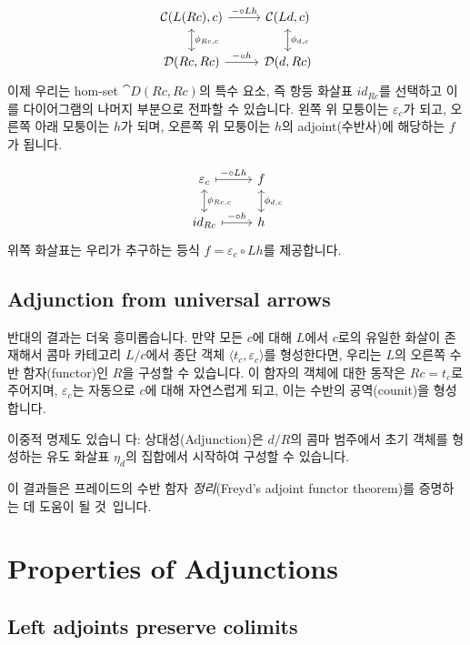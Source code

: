 \documentclass[DaoFP]{subfiles}
\begin{document}
\[
 \begin{tikzcd}
 \mathcal{C}(L (R c), c)
 \arrow[d, leftrightarrow, "\phi_{R c, c}"]
 \arrow[r, "- \circ L h"]
 &
 \mathcal{C}(L d, c)
  \arrow[d, leftrightarrow, "\phi_{d, c}"]
 \\
 \mathcal{D}(R c, R c)
 \arrow[r, "- \circ h"]
& \mathcal{D}(d, R c)
 \end{tikzcd}
\]
이제 우리는 hom-set $\cat D(R c, R c)$의 특수 요소, 즉 항등 화살표 $id_{R c}$를 선택하고 이를 다이어그램의 나머지 부분으로 전파할 수 있습니다. 왼쪽 위 모퉁이는 $\varepsilon_c$가 되고, 오른쪽 아래 모퉁이는 $h$가 되며, 오른쪽 위 모퉁이는 $h$의 adjoint(수반사)에 해당하는 $f$가 됩니다.

\[
 \begin{tikzcd}
\varepsilon_c
 \arrow[d, leftrightarrow, "\phi_{R c, c}"]
 \arrow[r, maps to, "- \circ L h"]
 &
f
  \arrow[d, leftrightarrow, "\phi_{d, c}"]
 \\
id_{R c}
 \arrow[r, maps to, "- \circ h"]
& h
 \end{tikzcd}
\]
위쪽 화살표는 우리가 추구하는 등식 $f = \varepsilon_c \circ L h$를 제공합니다.

\subsection{Adjunction from universal arrows}

반대의 결과는 더욱 흥미롭습니다. 만약 모든 $c$에 대해 $L$에서 $c$로의 유일한 화살이 존재해서 콤마 카테고리 $L/c$에서 종단 객체 $\langle t_c, \varepsilon_c \rangle$를 형성한다면, 우리는 $L$의 오른쪽 수반 함자(functor)인 $R$을 구성할 수 있습니다. 이 함자의 객체에 대한 동작은 $R c = t_c$로 주어지며, $\varepsilon_c$는 자동으로 $c$에 대해 자연스럽게 되고, 이는 수반의 공역(counit)을 형성합니다.

이중적 명제도 있습니 다: 상대성(Adjunction)은 $d/R$의 콤마 범주에서 초기 객체를 형성하는 유도 화살표 $\eta_d$의 집합에서 시작하여 구성할 수 있습니다.

이 결과들은 프레이드의 수반 함자 \textit{정리}(Freyd's adjoint functor theorem)를 증명하는 데 도움이 될 것~입니다.

\section{Properties of Adjunctions}

\subsection{Left adjoints preserve colimits}
\end{document}
